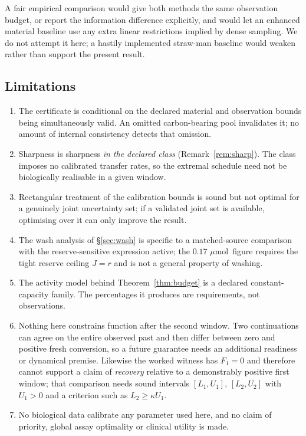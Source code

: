 \documentclass[11pt]{article}
\theoremstyle{plain}
\theoremstyle{definition}
\theoremstyle{remark}
\newcommand{\mumol}{\ensuremath{\mu\mathrm{mol}}}
\newcommand{\Lc}{L}
\begin{document}
A fair empirical comparison would give both methods the same observation
budget, or report the information difference explicitly, and would let an
enhanced material baseline use any extra linear restrictions implied by dense
sampling. We do not attempt it here; a hastily implemented straw-man baseline
would weaken rather than support the present result.

\subsection{Limitations}

\begin{enumerate}
\item The certificate is conditional on the declared material and observation
bounds being simultaneously valid. An omitted carbon-bearing pool invalidates
it; no amount of internal consistency detects that omission.
\item Sharpness is sharpness \emph{in the declared class}
(Remark~\ref{rem:sharp}). The class imposes no calibrated transfer rates, so
the extremal schedule need not be biologically realisable in a given window.
\item Rectangular treatment of the calibration bounds is sound but not optimal
for a genuinely joint uncertainty set; if a validated joint set is available,
optimising over it can only improve the result.
\item The wash analysis of \S\ref{sec:wash} is specific to a matched-source
comparison with the reserve-sensitive expression active; the $0.17$ \mumol\
figure requires the tight reserve ceiling $J=r$ and is not a general property
of washing.
\item The activity model behind Theorem~\ref{thm:budget} is a declared
constant-capacity family. The percentages it produces are requirements, not
observations.
\item Nothing here constrains function after the second window. Two
continuations can agree on the entire observed past and then differ between
zero and positive fresh conversion, so a future guarantee needs an additional
readiness or dynamical premise. Likewise the worked witness has $F_1=0$ and
therefore cannot support a claim of \emph{recovery} relative to a
demonstrably positive first window; that comparison needs sound intervals
$[\Lc_1,U_1]$, $[\Lc_2,U_2]$ with $U_1>0$ and a criterion such as
$\Lc_2\ge\kappa U_1$.
\item No biological data calibrate any parameter used here, and no claim of
priority, global assay optimality or clinical utility is made.
\end{enumerate}
\end{document}
